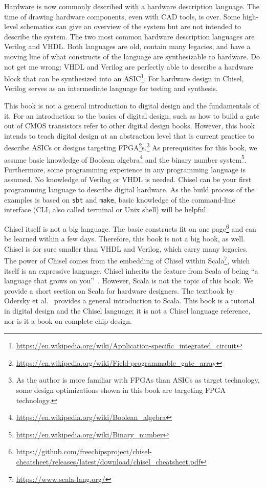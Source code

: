 \documentclass[%
    10pt,
    headinclude, footexclude,
    openright, %
    notitlepage,
    cleardoubleempty,
    headsepline,
    pointlessnumbers,
    bibtotoc, idxtotoc,
    ]{scrbook}
\newcommand{\code}[1]{{\lstinline[basicstyle=\small\ttfamily]{#1}}}
\newcommand{\myref}[2]{\href{#1}{#2}}
\renewcommand{\myref}[2]{{#2}{\footnote{\url{#1}}}}
\begin{document}
Hardware is now commonly described with a hardware description language.
The time of drawing hardware components, even with CAD tools, is
over. Some high-level schematics can give an overview of the system but are
not intended to describe the system.
The two most common hardware description languages are Verilog and VHDL.
Both languages are old, contain many legacies, and have a moving line of what
constructs of the language are synthesizable to hardware.
Do not get me wrong: VHDL and Verilog are perfectly able to describe a hardware
block that can be synthesized into an
\myref{https://en.wikipedia.org/wiki/Application-specific_integrated_circuit}{ASIC}.
For hardware design in Chisel, Verilog serves as an intermediate language
for testing and synthesis.

This book is not a general introduction to digital design and the fundamentals of it.
For an introduction to the basics of digital design, such as how to build a gate out of
CMOS transistors refer to other digital design books.
However, this book intends to teach digital design at an abstraction level that is
current practice to describe ASICs or designs targeting
\myref{https://en.wikipedia.org/wiki/Field-programmable_gate_array}{FPGA}s.\footnote{As the author is more familiar with FPGAs
than ASICs as target technology, some design optimizations shown in this book are
targeting FPGA technology.}
As prerequisites for this book, we assume basic knowledge of
\myref{https://en.wikipedia.org/wiki/Boolean_algebra}{Boolean algebra} and the
\myref{https://en.wikipedia.org/wiki/Binary_number}{binary number system}.
Furthermore, some programming experience in any programming language
is assumed. No knowledge of Verilog or VHDL is needed.
Chisel can be your first programming language to describe digital hardware.
As the build process of the examples is based on \code{sbt} and \code{make},
basic knowledge of the command-line interface (CLI, also called terminal or
Unix shell) will be helpful.

Chisel itself is not a big language. The basic constructs fit on
\myref{https://github.com/freechipsproject/chisel-cheatsheet/releases/latest/download/chisel_cheatsheet.pdf}{one page}
and can be learned within a few days.
Therefore, this book is not a big book, as well.
Chisel is for sure smaller than VHDL and Verilog, which carry many legacies.
The power of Chisel comes from the embedding of Chisel within
\myref{https://www.scala-lang.org/}{Scala}, which itself is an expressive language.
Chisel inherits the feature from Scala of being ``a language that grows on you''~\cite{Scala}.
However, Scala is not the topic of this book.
We provide a short section on Scala for hardware designers.
The textbook by Odersky et al.~\cite{Scala} provides a general introduction
to Scala.
This book is a tutorial in digital design and the Chisel language; it is not
a Chisel language reference, nor is it a book on complete chip design.
\end{document}
